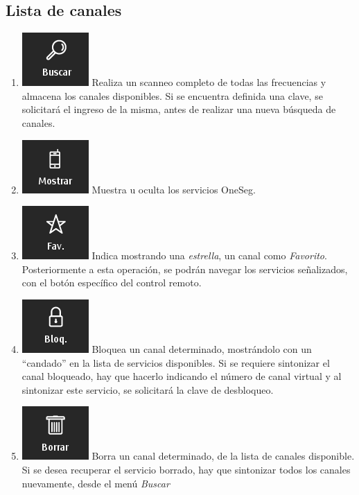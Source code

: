 \documentclass{article}
\begin{document}
\subsection{Lista de canales}
	\begin{enumerate}[label*=\arabic*.]
	\item \includegraphics[scale=0.60,keepaspectratio=true]{buscar} Realiza un scanneo completo de todas las frecuencias y almacena los canales disponibles.
	Si se encuentra definida una clave, se solicitará el ingreso de la misma, antes de realizar una nueva búsqueda de canales.
	\item \includegraphics[scale=0.60,keepaspectratio=true]{mostrar} Muestra u oculta los servicios OneSeg.
	\item \includegraphics[scale=0.60,keepaspectratio=true]{fav} Indica mostrando una \textit{estrella}, un canal como \textit{Favorito}. Posteriormente a esta operación, se podrán navegar los servicios señalizados, con el botón específico del control remoto.
	\item \includegraphics[scale=0.60,keepaspectratio=true]{bloq} Bloquea un canal determinado, mostrándolo con un ``candado'' en la lista de servicios disponibles. Si se requiere sintonizar el canal bloqueado, hay que hacerlo indicando el número de canal virtual y al sintonizar este servicio, se solicitará la clave de desbloqueo.
	\item \includegraphics[scale=0.60,keepaspectratio=true]{borrar} Borra un canal determinado, de la lista de canales disponible. 
	Si se desea recuperar el servicio borrado, hay que sintonizar todos los canales nuevamente, desde el menú \textit{Buscar}
	\end{enumerate}
\end{document}
